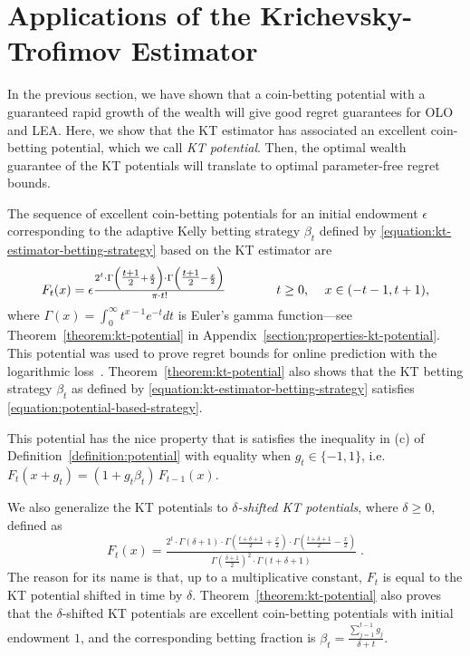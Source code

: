 \section{Applications of the Krichevsky-Trofimov Estimator}
\label{section:kt-estimator}

In the previous section, we have shown that a coin-betting potential with a
guaranteed rapid growth of the wealth will give good regret guarantees for
\ac{OLO} and \ac{LEA}. Here, we show that the KT estimator has associated an
excellent coin-betting potential, which we call \emph{KT potential}.  Then, the
optimal wealth guarantee of the KT potentials will translate to optimal
parameter-free regret bounds.

The sequence of excellent coin-betting potentials for an initial endowment $\epsilon$
corresponding to the adaptive Kelly betting strategy
$\beta_t$ defined by \eqref{equation:kt-estimator-betting-strategy}
based on the KT estimator are
\begin{equation}
\label{equation:kt-estimator-potential}
F_t(x) = \epsilon \tfrac{2^t \cdot \Gamma \left( \tfrac{t+1}{2} + \frac{x}{2} \right) \cdot \Gamma \left( \tfrac{t+1}{2} - \frac{x}{2} \right)}{\pi \cdot t!}
\qquad \qquad \text{$t \ge 0$, \quad $x \in \left(-t-1, t+1\right)$,}
\end{equation}
where $\Gamma(x) = \int_0^\infty t^{x-1} e^{-t} dt$ is Euler's gamma
function---see Theorem~\ref{theorem:kt-potential} in
Appendix~\ref{section:properties-kt-potential}.  This potential was used to
prove regret bounds for online prediction with the logarithmic
loss~\cite{Krichevsky-Trofimov-1981}\cite[Chapter
9.7]{Cesa-Bianchi-Lugosi-2006}.  Theorem~\ref{theorem:kt-potential} also shows
that the KT betting strategy $\beta_t$ as defined by
\eqref{equation:kt-estimator-betting-strategy} satisfies
\eqref{equation:potential-based-strategy}.

This potential has the nice property that is satisfies the inequality in
(c) of Definition~\ref{definition:potential} with equality when $g_t\in
\{-1,1\}$, i.e. $F_t(x+g_t)=(1+g_t \beta_t) \, F_{t-1}(x)$.

We also generalize the KT potentials to \emph{$\delta$-shifted KT
potentials}, where $\delta\geq0$, defined as
\[
F_t(x) = \tfrac{2^t \cdot \Gamma\left(\delta + 1 \right) \cdot \Gamma\left(\tfrac{t+\delta+1}{2} + \frac{x}{2} \right) \cdot \Gamma\left(\tfrac{t+\delta+1}{2} - \frac{x}{2} \right)}{\Gamma\left(\tfrac{\delta+1}{2} \right)^2 \cdot \Gamma \left(t+\delta+1\right)} \; .
\]
The reason for its name is that, up to a multiplicative constant, $F_t$ is
equal to the KT potential shifted in time by $\delta$.
Theorem~\ref{theorem:kt-potential} also proves that the $\delta$-shifted KT
potentials are excellent coin-betting potentials with initial endowment $1$,
and the corresponding betting fraction is $\beta_t = \tfrac{\sum_{j=1}^{t-1}
g_j}{\delta+t}$.

